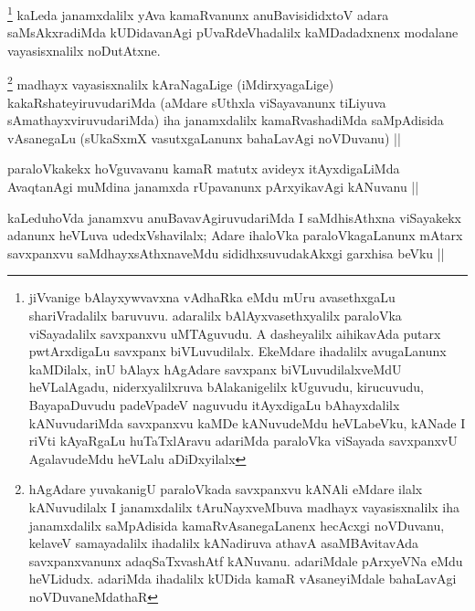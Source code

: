 
\begin{artha}
\footnote[1]{jiVvanige bAlayxywvavxna vAdhaRka eMdu mUru avasethxgaLu shariVradalilx baruvuvu. adaralilx bAlAyxvasethxyalilx paraloVka viSayadalilx savxpanxvu uMTAguvudu. A dasheyalilx aihikavAda putarx pwtArxdigaLu savxpanx biVLuvudilalx. EkeMdare ihadalilx avugaLanunx kaMDilalx, inU bAlayx hAgAdare savxpanx biVLuvudilalxveMdU heVLalAgadu, niderxyalilxruva bAlakanigelilx kUguvudu, kirucuvudu, BayapaDuvudu padeVpadeV naguvudu itAyxdigaLu bAhayxdalilx kANuvudariMda savxpanxvu kaMDe kANuvudeMdu heVLabeVku, kANade I riVti kAyaRgaLu huTaTxlAravu adariMda paraloVka viSayada savxpanxvU AgalavudeMdu heVLalu aDiDxyilalx}
kaLeda janamxdalilx yAva kamaRvanunx anuBavisididxtoV adara saMsAkxradiMda kUDidavanAgi pUvaRdeVhadalilx kaMDadadxnenx modalane vayasisxnalilx noDutAtxne.
\end{artha}

\begin{artha}
\footnote[2]{hAgAdare yuvakanigU paraloVkada savxpanxvu kANAli eMdare ilalx kANuvudilalx I janamxdalilx tAruNayxveMbuva madhayx vayasisxnalilx iha janamxdalilx saMpAdisida kamaRvAsanegaLanenx hecAcxgi noVDuvanu, kelaveV samayadalilx ihadalilx kANadiruva athavA asaMBAvitavAda savxpanxvanunx adaqSaTxvashAtf kANuvanu. adariMdale pArxyeVNa eMdu heVLidudx. adariMda ihadalilx kUDida kamaR vAsaneyiMdale bahaLavAgi noVDuvaneMdathaR}
madhayx vayasisxnalilx kAraNagaLige (iMdirxyagaLige) kakaRshateyiruvudariMda (aMdare sUthxla viSayavanunx tiLiyuva sAmathayxviruvudariMda) iha janamxdalilx kamaRvashadiMda saMpAdisida vAsanegaLu (sUkaSxmX vasutxgaLanunx bahaLavAgi noVDuvanu) ||
\end{artha}

\begin{artha}
paraloVkakekx hoVguvavanu kamaR matutx avideyx itAyxdigaLiMda AvaqtanAgi muMdina janamxda rUpavanunx pArxyikavAgi kANuvanu ||
\end{artha}


\begin{artha}
kaLeduhoVda janamxvu anuBavavAgiruvudariMda I saMdhisAthxna viSayakekx adanunx heVLuva udedxVshavilalx; Adare ihaloVka paraloVkagaLanunx mAtarx savxpanxvu saMdhayxsAthxnaveMdu sididhxsuvudakAkxgi garxhisa beVku ||
\end{artha}

